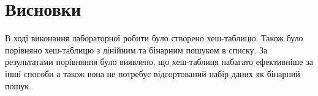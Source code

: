 \newpage
\section{Висновки}
В ході виконання лабораторної робити було створено хеш-таблицю.
Також було порівняно хеш-таблицю з лінійним та бінарним пошуком в списку.
За результатами порівняння було виявлено, що хеш-таблиця набагато ефективніше за інші способи
а також вона не потребує відсортований набір даних як бінарний пошук.
